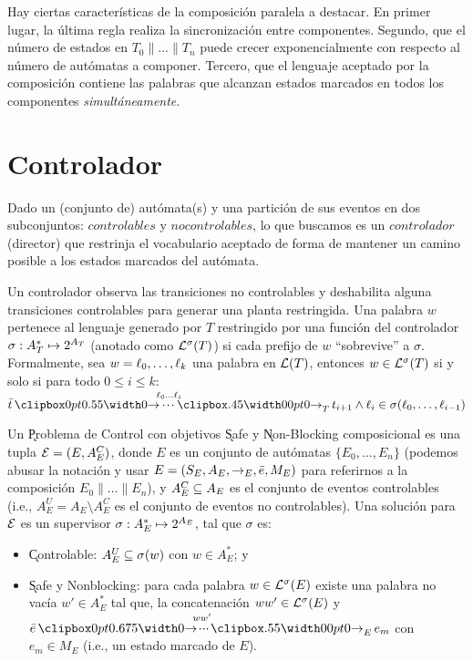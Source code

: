 Hay ciertas características de la composición paralela a destacar. En primer lugar, la última regla realiza la sincronización entre componentes. Segundo, que el número de estados en $T_0 \| ... \| T_n$ puede crecer exponencialmente con respecto al número de autómatas a componer. Tercero, que el lenguaje aceptado por la composición contiene las palabras que alcanzan estados marcados en todos los componentes \textit{simultáneamente}.

\section{Controlador}

Dado un (conjunto de) autómata(s) y una partición de sus eventos en dos subconjuntos: $controlables$ y $no controlables$, lo que buscamos es un $controlador$ (director) que restrinja el vocabulario aceptado de forma de mantener un camino posible a los estados marcados del autómata.

Un controlador observa las transiciones no controlables y deshabilita alguna transiciones controlables para generar una planta restringida. Una palabra $w$ pertenece al lenguaje generado por $T$ restringido por una función del controlador $\sigma : A_T^* \mapsto 2^{A_T}$ (anotado como $\mathcal{L}^\sigma(T)$) si cada prefijo de $w$ ``sobrevive'' a $\sigma$.
Formalmente, sea $w = \ell_0,\ldots,\ell_k$ una palabra en $\mathcal{L}(T)$, entonces $w \in \mathcal{L}^\sigma(T)$ si y solo si para todo $0 \leq i \leq k$:
$
\init{t} \run{\,\l_0}{\l_i}{T} t_{i+1} \wedge \l_i \in \sigma(\l_0,\ldots,\l_{i-1})
$

\begin{definition} \label{def:control-problem}
	Un \k{Problema de Control} con objetivos \k{Safe} y \k{Non-Blocking} composicional es una tupla $\mathcal{E} = (E, A_E^C)$, donde $E$ es un conjunto de autómatas $\{E_0,\ldots,E_n\}$ (podemos abusar la notación y usar $E = (S_E,A_E,\rightarrow_E,\bar{e},M_E)$ para referirnos a la composición $E_0\|\ldots\|E_n$), y $A_E^C \subseteq A_E$ es el conjunto de eventos controlables (i.e., $A_E^U = A_E \setminus A_E^C$ es el conjunto de eventos no controlables).
	Una solución para $\mathcal{E}$ es un supervisor $\sigma : A_E^* \mapsto 2^{A_E}$, tal que $\sigma$ es:
	\begin{itemize}[itemsep=4pt,topsep=-8pt]
		
		\item \k{Controlable}: $A_E^U \subseteq \sigma(w)$ con $w \in A_E^*$; y
		
		\item \k{Safe y Nonblocking}: para cada palabra $w \in \mathcal{L}^\sigma(E)$ existe una palabra no vacía $w' \in A_E^*$ tal que, la concatenación $ww' \in \mathcal{L}^\sigma(E)$ y $\init{e} \runw{\;ww'}{E} e_m$ con $e_m \in M_E$ (i.e., un estado marcado de $E$).
		
	\end{itemize}
	
\end{definition}

